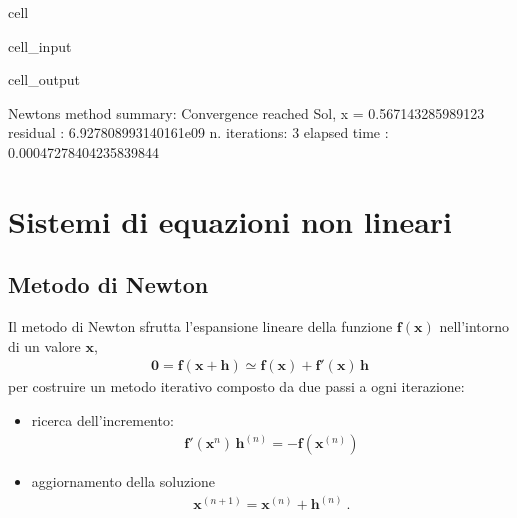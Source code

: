 \documentclass[letterpaper,10pt,italian]{jupyterBook}
\begin{document}
\begin{sphinxuseclass}{cell}
\begin{sphinxVerbatimInput}
\begin{sphinxuseclass}{cell_input}
\end{sphinxuseclass}\end{sphinxVerbatimInput}
\begin{sphinxVerbatimOutput}

\begin{sphinxuseclass}{cell_output}
\begin{sphinxVerbatim}[commandchars=\\\{\}]
Newton\PYGZsq{}s method summary: 
Convergence reached
Sol, x = \PYGZhy{}0.567143285989123
residual     : 6.927808993140161e\PYGZhy{}09
n. iterations: 3
elapsed time : 0.00047278404235839844
\end{sphinxVerbatim}

\end{sphinxuseclass}\end{sphinxVerbatimOutput}

\end{sphinxuseclass}

\section{Sistemi di equazioni non lineari}
\label{\detokenize{ch/numerics/nonlinear:sistemi-di-equazioni-non-lineari}}

\subsection{Metodo di Newton}
\label{\detokenize{ch/numerics/nonlinear:id1}}
\sphinxAtStartPar
Il metodo di Newton sfrutta l’espansione lineare della funzione \(\mathbf{f}(\mathbf{x})\) nell’intorno di un valore \(\mathbf{x}\),
\begin{equation*}
\begin{split}\mathbf{0} = \mathbf{f}(\mathbf{x} + \mathbf{h}) \simeq \mathbf{f}(\mathbf{x}) + \mathbf{f}'(\mathbf{x}) \, \mathbf{h}\end{split}
\end{equation*}
\sphinxAtStartPar
per costruire un metodo iterativo composto da due passi a ogni iterazione:
\begin{itemize}
\item {} 
\sphinxAtStartPar
ricerca dell’incremento:
\begin{equation*}
\begin{split}\mathbf{f}'(\mathbf{x}^{n}) \, \mathbf{h}^{(n)} = - \mathbf{f}(\mathbf{x}^{(n)})\end{split}
\end{equation*}
\item {} 
\sphinxAtStartPar
aggiornamento della soluzione
\begin{equation*}
\begin{split}\mathbf{x}^{(n+1)} = \mathbf{x}^{(n)} + \mathbf{h}^{(n)} \ .\end{split}
\end{equation*}
\end{itemize}
\end{document}
